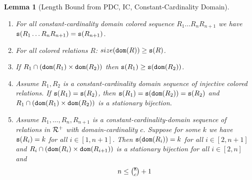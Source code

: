 \documentclass{lmcs}
\newtheorem{lemma}[theorem]{Lemma}
\begin{document}
\begin{lemma}[Length Bound from PDC, IC, Constant-Cardinality Domain]
\label{lemma-length-bound}
\begin{enumerate}
\item
For all constant-cardinality domain colored sequence $R_1 \ldots R_n R_{n+1}$ we have
${\tt s}(R_1 \ldots R_n R_{n+1}) = {\tt s}(R_{n+1})$.

\item
For all colored relations $R$: $size({\tt dom}(R)) \ge {\tt s}(R)$.
 
\item
If $R_1 \cap ({\tt dom}(R_1) \times {\tt dom}(R_2))$ then ${\tt s}(R_1) \ge {\tt s}({\tt dom}(R_2))$.

\item
Assume $R_1,R_2$ is a constant-cardinality domain sequence 
of injective colored relations.
If ${\tt s}(R_1) = {\tt s}(R_2)$, then ${\tt s}(R_1) = {\tt s}({\tt dom}(R_2)) = {\tt s}(R_2)$ and 
$R_1 \cap ({\tt dom}(R_1) \times {\tt dom}(R_2))$ is a
stationary bijection.

\item
Assume $R_1, \ldots, R_n, R_{n+1}$ is a constant-cardinality-domain sequence of 
relations in ${\mathcal R}^+$ with domain-cardinality $c$.
Suppose for some $k$
we have ${\tt s}(R_i) = k$ for all $i \in [1,n+1]$. Then ${\tt s}({\tt dom}(R_i)) = k$
for all $i \in [2,n+1]$ and 
$R_i \cap ({\tt dom}(R_i) \times {\tt dom}(R_{i+1}))$ is a stationary bijection for all $i \in [2,n]$ and
$$
n \le \newton{\MaxInd}{c}+1
$$ 
\end{enumerate}
\end{lemma}
\end{document}
